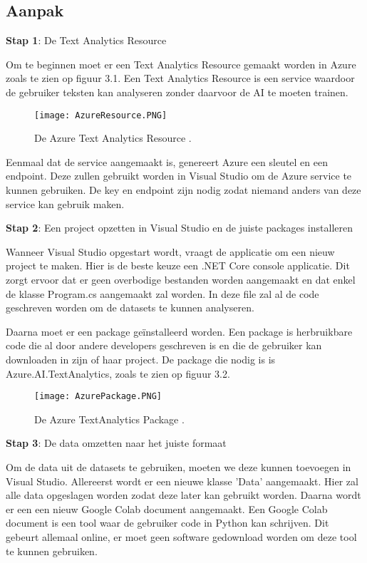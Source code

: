 \subsection{Aanpak}
\label{aanpakazure}
\textbf{Stap 1}: De Text Analytics Resource

Om te beginnen moet er een Text Analytics Resource gemaakt worden in Azure zoals te zien op figuur 3.1. Een Text Analytics Resource is een service waardoor de gebruiker teksten kan analyseren zonder daarvoor de AI te moeten trainen. \autocite{Microsoft2020}

\begin{figure}[!htbp]
    \texttt{[image: AzureResource.PNG]}
    \caption{\label{azureresource}De Azure Text Analytics Resource \autocite{Microsoft2021}.}
\end{figure}
\FloatBarrier

Eenmaal dat de service aangemaakt is, genereert Azure een sleutel en een endpoint. Deze zullen gebruikt worden in Visual Studio om de Azure service te kunnen gebruiken. De key en endpoint zijn nodig zodat niemand anders van deze service kan gebruik maken. 

\textbf{Stap 2}: Een project opzetten in Visual Studio en de juiste packages installeren

Wanneer Visual Studio opgestart wordt, vraagt de applicatie om een nieuw project te maken. Hier is de beste keuze een .NET Core console applicatie. Dit zorgt ervoor dat er geen overbodige bestanden worden aangemaakt en dat enkel de klasse Program.cs aangemaakt zal worden. In deze file zal al de code geschreven worden om de datasets te kunnen analyseren. \autocite{Microsoft2020}

Daarna moet er een package geïnstalleerd worden. Een package is herbruikbare code die al door andere developers geschreven is en die de gebruiker kan downloaden in zijn of haar project. \autocite{Microsoft2018} De package die nodig is is Azure.AI.TextAnalytics, zoals te zien op figuur 3.2.

\begin{figure}[!htbp]
    \texttt{[image: AzurePackage.PNG]}
    \caption{\label{azurepackage}De Azure TextAnalytics Package \autocite{Microsoft2020}.}
\end{figure}
\FloatBarrier


\textbf{Stap 3}: De data omzetten naar het juiste formaat

Om de data uit de datasets te gebruiken, moeten we deze kunnen toevoegen in Visual Studio. Allereerst wordt er een nieuwe klasse 'Data' aangemaakt. Hier zal alle data opgeslagen worden zodat deze later kan gebruikt worden. Daarna wordt er een een nieuw Google Colab document aangemaakt. Een Google Colab document is een tool waar de gebruiker code in Python kan schrijven. Dit gebeurt allemaal online, er moet geen software gedownload worden om deze tool te kunnen gebruiken. 

